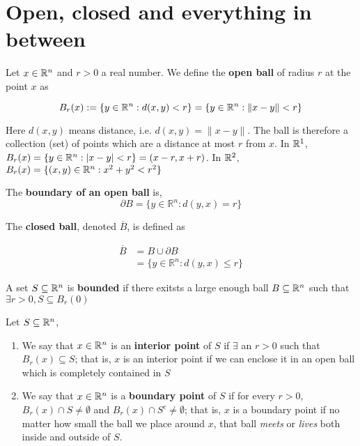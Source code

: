 \documentclass[11pt]{article}
\begin{document}
\section{Open, closed and everything in between}

\begin{defn}
  \label{open ball}
  Let $x\in \mathbb{R}^n$ and $r > 0$ a real number. We define the \textbf{open ball} of radius $r$ at the point $x$ as

  \[
    B_r(x) := \{ y \in \mathbb{R}^n: d(x, y) < r\} = \{ y \in \mathbb{R}^n: \| x-y\| < r\}
  \]
  \begin{rem}
    Here $d(x,y)$ means distance, i.e. $d(x,y) = \| x-y \|$. The ball is therefore a collection (set) of points which are a distance at most $r$ from $x$. In $\mathbb{R}^1$, $B_r(x) = \{ y \in \mathbb{R}^n: | x-y| < r\} = (x-r, x+r)$. In $\mathbb{R}^2$, $B_r(x) = \{ (x,y) \in \mathbb{R}^n: x^2 + y^2 < r^2\}$
  \end{rem}
\end{defn}


\begin{defn}
  \label{boundary of open ball}
  The \textbf{boundary of an open ball} is,
  \[
    \partial B = \{ y\in \mathbb{R}^n: d(y, x) = r\}
  \]
\end{defn}

\begin{defn}
  \label{closed ball}
  The \textbf{closed ball}, denoted $\overline{B}$, is defined as

  \begin{align*}
    \overline{B} &= B\cup \partial B \\
    &= \{ y\in \mathbb{R}^n: d(y, x) \leq r\}
  \end{align*}
\end{defn}


\begin{defn}
  \label{bounded set}
  A set $S\subseteq \mathbb{R}^n$ is \textbf{bounded} if there exitsts a large enough ball $B\subseteq \mathbb{R}^n$ such that $\exists r > 0, S\subseteq B_r(0)$
\end{defn}


\begin{defn}
  \label{interior and boundary point}
  Let $S\subseteq \mathbb{R}^n$,
  \begin{enumerate}
    \item We say that  $x\in\mathbb{R}^n$ is an \textbf{interior point} of $S$ if $\exists$ an $r>0$ such that $B_r(x)\subseteq S$; that is, $x$ is an interior point if we can enclose it in an open ball which is completely contained in $S$
    \label{interior point}
    \item We say that  $x\in\mathbb{R}^n$ is a \textbf{boundary point} of $S$ if for every $r>0$, $B_r(x)\cap S\neq \emptyset$ and $B_r(x)\cap S^c \neq \emptyset$; that is, $x$ is a boundary point if no matter how small the ball we place around $x$, that ball \textit{meets} or \textit{lives} both inside and outside of $S$.
    \label{boundary point}
  \end{enumerate}

\end{defn}
\end{document}
